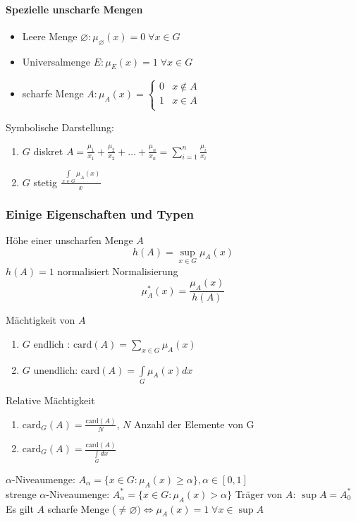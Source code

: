 \documentclass[a4paper]{scrartcl}
\begin{document}
\paragraph{Spezielle unscharfe Mengen}
\begin{itemize}
	\item Leere Menge $\varnothing : \mu_\varnothing (x) = 0 \;\forall x \in G$
	\item Universalmenge $E: \mu_E (x) = 1\; \forall x \in G$
	\item scharfe Menge $A: \mu_A(x) = \left\{ \begin{array}{lr} 0 & x \notin A\\ 1 & x \in A \\ \end{array} \right.$
\end{itemize}
Symbolische Darstellung:
\begin{enumerate}
	\item $G$ diskret $A= \frac{\mu_1}{x_1} + \frac{\mu_2}{x_2} + \dots + \frac{\mu_n}{x_n} = \sum\limits_{i=1}^{n} \frac{\mu_i}{x_i}$
	\item $G$ stetig $\frac{\int\limits_{x \in G} \mu_A(x)}{x}$
\end{enumerate}

\subsubsection{Einige Eigenschaften und Typen}
Höhe einer unscharfen Menge $A$
\[ h(A) = \sup\limits_{x \in G} \mu_A (x) \]
$ h(A) = 1$ normalisiert
Normalisierung
\[ \mu_A^*(x) = \frac{\mu_A (x)}{h(A)} \]

Mächtigkeit von $A$
\begin{enumerate}
\item $G$ endlich : $\text{card}(A) = \sum\limits_{x\in G} \mu_A (x)$
\item $G$ unendlich: $\text{card}(A) = \int\limits_G \mu_A (x) dx$
\end{enumerate}
Relative Mächtigkeit
\begin{enumerate}
\item $\text{card}_G (A) = \frac{\text{card}(A)}{N}$, $N$ Anzahl der Elemente von G
\item $\text{card}_G (A) = \frac{\text{card}(A)}{\int\limits_G dx}$
\end{enumerate}

$\alpha$-Niveaumenge: $A_\alpha = \{ x \in G : \mu_A (x) \geq \alpha \}, \alpha \in [0,1]$\\
strenge $\alpha$-Niveaumenge: $A_\alpha^* = \{ x \in G : \mu_A (x) > \alpha \}$
Träger von $A$: $\sup A = A_0^*$
Es gilt $A$ scharfe Menge ($\neq \varnothing) \Leftrightarrow  \mu_A (x) = 1 \; \forall x \in \sup A$
\end{document}
